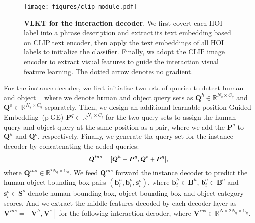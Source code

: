 \documentclass[10pt,twocolumn,letterpaper]{article}
\newcommand{\bd}[1]{\textbf{#1}}
\begin{document}
\begin{figure}[t]
\begin{center}
   \texttt{[image: figures/clip\_module.pdf]}
\end{center}
\vspace{-3.5mm}
   \caption{\bd{VLKT for the interaction decoder}. We first covert each HOI label into a phrase description and extract its text embedding based on CLIP text encoder, then apply the text embeddings of all HOI labels to initialize the classifier. Finally, we adopt the CLIP image encoder to extract visual features to guide the interaction visual feature learning. The dotted arrow denotes no gradient.}
  \vspace{-3.5mm}
\label{fig:clip}
\end{figure}

For the instance decoder, we first initialize two sets of queries to detect human and object ~\cite{dong2021visual} where we denote human and object query sets as $\bm{Q}^h\in \mathbb{R}^{N_q\times C_q}$ and $\bm{Q}^o\in \mathbb{R}^{N_q\times C_q}$ separately. Then, we design an additional learnable position Guided Embedding~(p-GE) $\bm{P}^q \in \mathbb{R}^{N_q\times C_q}$ for the two query sets to assign the human query and object query at the same position as a pair, where we add the $\bm{P}^q$ to $\bm{Q}^h$ and $\bm{Q}^o$, respectively. Finally, we generate the query set for the instance decoder by concatenating the added queries:
\begin{equation}
\small
\begin{aligned}
\bm{Q}^{ins} = [\bm{Q}^h + \bm{P}^q, \bm{Q}^o + \bm{P}^q],
\end{aligned}
\end{equation}
where $\bm{Q}^{ins} \in \mathbb{R}^{2N_q\times C_q}$. We feed $\bm{Q}^{ins}$ forward the instance decoder to predict the human-object bounding-box pairs $(\bm{b}^h_i, \bm{b}^o_i, \bm{s}^o_i)$, where $\bm{b}^h_i \in \bm{B}^h$,  $\bm{b}^o_i \in \bm{B}^o$ and $\bm{s}^o_i \in \bm{S}^o$ denote human bounding-box, object bounding-box and object category scores. And we extract the middle features decoded by each decoder layer as $\mathbf{V}^{ins} = [\mathbf{V}^{h}, \mathbf{V}^{o}]$ for the following interaction decoder, where $\mathbf{V}^{ins} \in \mathbb{R}^{N \times 2N_q\times C_q}$. 
\end{document}
